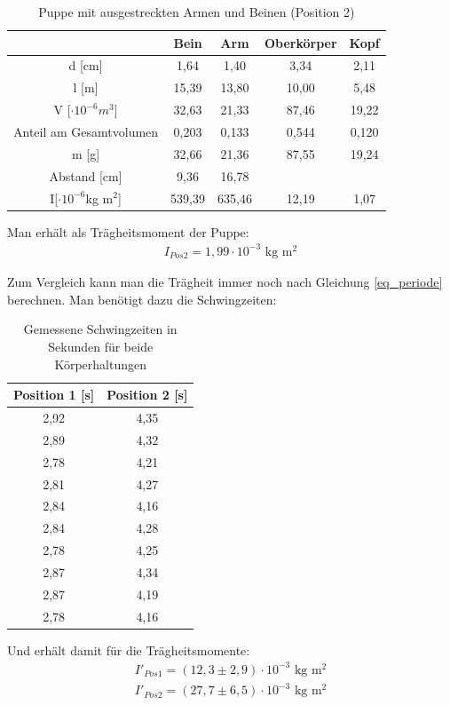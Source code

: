 \begin{table}[htbp]
\begin{tabular}{|c|c|c|c|c|}
\hline 		
&	Bein&	Arm	&Oberkörper	&Kopf	\\ \hline	
d [cm]	&1,64	&	1,40	&	3,34	&	2,11	\\ \hline		
l [m]	&15,39	&	13,80	&	10,00	&	5,48\\ \hline	
V [$\cdot10^{-6}m^3$]	&32,63	&21,33	&87,46	&19,22\\ \hline	
Anteil am Gesamtvolumen&	0,203	&0,133&	0,544	&0,120\\ \hline
m [g]	&32,66&	21,36	&87,55	&19,24\\ \hline	
Abstand [cm]&	9,36	&16,78&&\\ \hline	
I[$\cdot 10^{-6}$kg m$^2$]&		539,39&	635,46&	12,19&	1,07\\ \hline	
\end{tabular} 
\caption{Puppe mit ausgestreckten Armen und Beinen (Position 2)}
\end{table}

Man erhält als Trägheitsmoment der Puppe:
\begin{align*}
I_{Pos 2}=1,99\cdot 10^{-3}\text{ kg m$^2$}
\end{align*}

Zum Vergleich kann man die Trägheit immer noch nach Gleichung \eqref{eq_periode} berechnen. Man benötigt dazu die Schwingzeiten:
\begin{table}[H]
\begin{tabular}{|c|c|}
\hline 
Position 1 [s] & Position 2 [s]\\ \hline 
2,92&	4,35\\ \hline 
2,89&	4,32\\ \hline 
2,78&	4,21\\ \hline 
2,81&	4,27\\ \hline 
2,84&	4,16\\ \hline 
2,84&	4,28\\ \hline 
2,78&	4,25\\ \hline 
2,87&	4,34\\ \hline 
2,87&	4,19\\ \hline 
2,78&	4,16\\ \hline 
\end{tabular} 
\caption{Gemessene Schwingzeiten in Sekunden für beide Körperhaltungen}
\end{table}

Und erhält damit für die Trägheitsmomente:
\begin{align*}
I'_{Pos 1}=(12,3 \pm 2,9)\cdot 10^{-3} \text{ kg m$^2$}\\
I'_{Pos 2}=(27,7 \pm 6,5)\cdot 10^{-3} \text{ kg m$^2$}
\end{align*}

